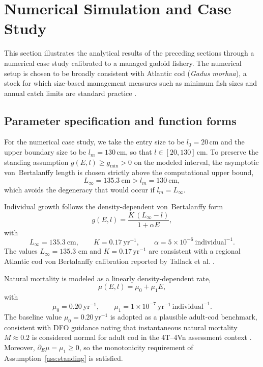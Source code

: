 \documentclass[pdflatex,sn-mathphys-num]{sn-jnl}
\theoremstyle{thmstyleone}
\theoremstyle{definition}
\theoremstyle{remark}
\begin{document}
\section{Numerical Simulation and Case Study}\label{sec:numerical}

This section illustrates the analytical results of the preceding sections
through a numerical case study calibrated to a managed gadoid fishery. The
numerical setup is chosen to be broadly consistent with Atlantic cod
(\textit{Gadus morhua}), a stock for which size-based management measures such as
minimum fish sizes and annual catch limits are standard practice \cite{tallack_regional_2009,noaa_fisheries_atlantic_2026,liang2026separation}.

\subsection{Parameter specification and function forms}\label{subsec:params}

For the numerical case study, we take the entry size to be $l_0=20$\,cm and the upper boundary size to be $l_m=130$\,cm, so that $l\in[20,130]$\,cm. To preserve the standing assumption $g(E,l)\ge g_{\min}>0$ on the modeled interval, the asymptotic von~Bertalanffy length is chosen strictly above the computational upper bound,
\[
L_\infty = 135.3\ \text{cm} > l_m=130\ \text{cm},
\]
which avoids the degeneracy that would occur if $l_m=L_\infty$.

Individual growth follows the density-dependent von~Bertalanffy form
\begin{equation}\label{eq:gEL_num}
g(E,l)=\frac{K\,(L_\infty-l)}{1+\alpha E},
\end{equation}
with
\[
L_\infty=135.3\ \text{cm},\qquad
K=0.17\ \mathrm{yr}^{-1},\qquad
\alpha=5\times 10^{-6}\ \mathrm{individual}^{-1}.
\]
The values $L_\infty=135.3$ cm and $K=0.17\,\mathrm{yr}^{-1}$ are consistent with a regional Atlantic cod von Bertalanffy calibration reported by Tallack et al. \cite{tallack_regional_2009,noaa_fisheries_atlantic_2026,liu2026computational}.

Natural mortality is modeled as a linearly density-dependent rate,
\begin{equation}\label{eq:muEL_num}
\mu(E,l)=\mu_0+\mu_1 E,
\end{equation}
with
\[
\mu_0=0.20\ \mathrm{yr}^{-1},\qquad
\mu_1=1\times 10^{-7}\ \mathrm{yr}^{-1}\,\mathrm{individual}^{-1}.
\]
The baseline value $\mu_0=0.20\,\mathrm{yr}^{-1}$ is adopted as a plausible adult-cod benchmark, consistent with DFO guidance noting that instantaneous natural mortality $M\approx 0.2$ is considered normal for adult cod in the 4T--4Vn assessment context \cite{government_of_canada_rebuilding_2025,yu2026pattern}. Moreover, $\partial_E\mu=\mu_1\ge 0$, so the monotonicity requirement of Assumption~\ref{ass:standing} is satisfied.
\end{document}

